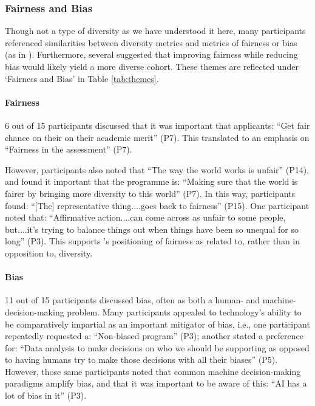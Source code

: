 \subsubsection{Fairness and Bias}
Though not a type of diversity as we have understood it here, many participants referenced similarities between diversity metrics and metrics of fairness or bias (as in \textcite{zhao2023fairness}). Furthermore, several suggested that improving fairness while reducing bias would likely yield a more diverse cohort. These themes are reflected under `Fairness and Bias' in Table \ref{tab:themes}.

\paragraph{Fairness}
6 out of 15 participants discussed that it was important that applicants: ``Get fair chance on their on their academic merit'' (P7). This translated to an emphasis on ``Fairness in the assessment'' (P7).

However, participants also noted that ``The way the world works is unfair'' (P14), and found it important that the programme is: ``Making sure that the world is fairer by bringing more diversity to this world'' (P7). In this way, participants found: ``[The] representative thing....goes back to fairness'' (P15). One participant noted that: ``Affirmative action....can come across as unfair to some people, but....it's trying to balance things out when things have been so unequal for so long'' (P3). This supports \textcite{zhao2023fairness}'s positioning of fairness as related to, rather than in opposition to, diversity. 

\paragraph{Bias}
11 out of 15 participants discussed bias, often as both a human- and machine-decision-making problem. Many participants appealed to technology's ability to be comparatively impartial as an important mitigator of bias, i.e., one participant repeatedly requested a: ``Non-biased program'' (P3); another stated a preference for: ``Data analysis to make decisions on who we should be supporting as opposed to having humans try to make those decisions with all their biases'' (P5). However, those same participants noted that common machine decision-making paradigms amplify bias, and that it was important to be aware of this: ``AI has a lot of bias in it'' (P3).

